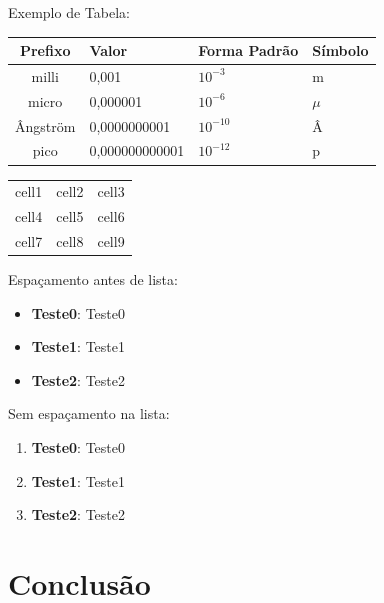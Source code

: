\documentclass[a4paper,11pt]{article}
\begin{document}
Exemplo de Tabela:
\begin{table}[H]
	\centering 
	\begin{tabular}{c | L{3cm} | C{3cm} | R{3cm} }
		\textbf{Prefixo} & \textbf{Valor} & \textbf{Forma Padrão} & \textbf{Símbolo} \\
		\hline
		milli & 0,001 & $10^{-3}$ & m \\
		micro & 0,000001 & $10^{-6}$ & $\mu$ \\
		Ângström & 0,0000000001 & $10^{-10}$ & Â \\
		pico & 0,000000000001 & $10^{-12}$ & p \\
	\end{tabular}
\end{table}

\begin{center}
	\begin{tabular}{ c|c|c } 
		\hline
		cell1 & cell2 & cell3 \\ 
		cell4 & cell5 & cell6 \\ 
		cell7 & cell8 & cell9 \\ 
		\hline
	\end{tabular}
\end{center}

Espaçamento antes de lista: \vspace{-1em}
\begin{itemize}
	\item \textbf{Teste0}: Teste0
    \item \textbf{Teste1}: Teste1
    \item \textbf{Teste2}: Teste2
\end{itemize}

Sem espaçamento na lista:

\begin{enumerate}[nolistsep]
	\item \textbf{Teste0}: Teste0
	\item \textbf{Teste1}: Teste1
	\item \textbf{Teste2}: Teste2
\end{enumerate}


\section{Conclusão}


\end{document}

